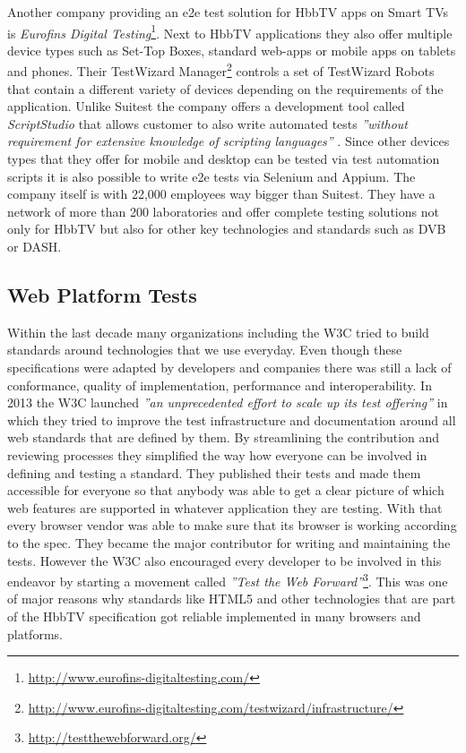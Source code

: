 Another company providing an e2e test solution for HbbTV apps on Smart TVs is \textit{Eurofins Digital Testing}\footnote{\url{http://www.eurofins-digitaltesting.com/}}.
Next to HbbTV applications they also offer multiple device types such as Set-Top Boxes, standard
web-apps or mobile apps on tablets and phones. Their TestWizard Manager\footnote{\url{http://www.eurofins-digitaltesting.com/testwizard/infrastructure/}}
controls a set of TestWizard Robots that contain a different variety of devices depending
on the requirements of the application. Unlike Suitest the company offers a development tool
called \textit{ScriptStudio} that allows customer to also write automated tests \textit{''without
requirement for extensive knowledge of scripting languages''} \cite{scriptstudio}. Since other
devices types that they offer for mobile and desktop can be tested via test automation scripts
it is also possible to write e2e tests via Selenium and Appium. The company itself is with
22,000 employees way bigger than Suitest. They have a network of more than 200 laboratories and
offer complete testing solutions not only for HbbTV but also for other key technologies and standards
such as DVB or DASH.

\subsection{Web Platform Tests}

Within the last decade many organizations including the W3C tried to build standards around
technologies that we use everyday. Even though these specifications were adapted by developers
and companies there was still a lack of conformance, quality of implementation, performance
and interoperability. In 2013 the W3C launched \textit{''an unprecedented effort to scale up
its test offering''} \cite{w3ctesting} in which they tried to improve the test infrastructure
and documentation around all web standards that are defined by them. By streamlining the
contribution and reviewing processes they simplified the way how everyone can be involved in
defining and testing a standard. They published their tests and made them accessible for everyone
so that anybody was able to get a clear picture of which web features are supported in whatever
application they are testing. With that every browser vendor was able to make sure that its
browser is working according to the spec. They became the major contributor for writing and
maintaining the tests. However the W3C also encouraged every developer to be involved in this
endeavor by starting a movement called \textit{''Test the Web Forward''}\footnote{\url{http://testthewebforward.org/}}.
This was one of major reasons why standards like HTML5 and other technologies that are part
of the HbbTV specification got reliable implemented in many browsers and platforms.

